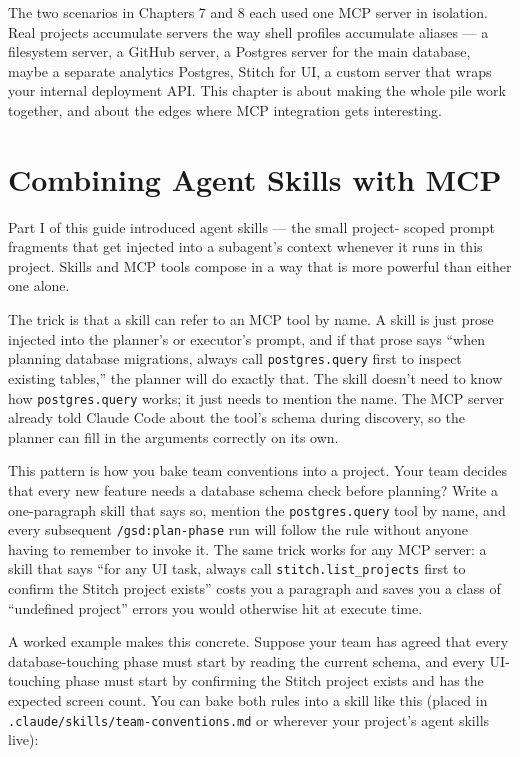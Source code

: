 \documentclass[11pt,letterpaper,openany]{book}
\begin{document}
The two scenarios in Chapters 7 and 8 each used one MCP server in
isolation. Real projects accumulate servers the way shell profiles
accumulate aliases --- a filesystem server, a GitHub server, a
Postgres server for the main database, maybe a separate analytics
Postgres, Stitch for UI, a custom server that wraps your internal
deployment API. This chapter is about making the whole pile work
together, and about the edges where MCP integration gets
interesting.

\section{Combining Agent Skills with MCP}

Part I of this guide introduced agent skills --- the small project-
scoped prompt fragments that get injected into a subagent's context
whenever it runs in this project. Skills and MCP tools compose in a
way that is more powerful than either one alone.

The trick is that a skill can refer to an MCP tool by name. A skill
is just prose injected into the planner's or executor's prompt, and
if that prose says ``when planning database migrations, always call
\texttt{postgres.query} first to inspect existing tables,'' the
planner will do exactly that. The skill doesn't need to know how
\texttt{postgres.query} works; it just needs to mention the name.
The MCP server already told Claude Code about the tool's schema
during discovery, so the planner can fill in the arguments correctly
on its own.

This pattern is how you bake team conventions into a project. Your
team decides that every new feature needs a database schema check
before planning? Write a one-paragraph skill that says so, mention
the \texttt{postgres.query} tool by name, and every subsequent
\texttt{/gsd:plan-phase} run will follow the rule without anyone
having to remember to invoke it. The same trick works for any MCP
server: a skill that says ``for any UI task, always call
\texttt{stitch.list\_projects} first to confirm the Stitch project
exists'' costs you a paragraph and saves you a class of
``undefined project'' errors you would otherwise hit at execute
time.

A worked example makes this concrete. Suppose your team has agreed
that every database-touching phase must start by reading the current
schema, and every UI-touching phase must start by confirming the
Stitch project exists and has the expected screen count. You can
bake both rules into a skill like this (placed in
\texttt{.claude/skills/team-conventions.md} or wherever your
project's agent skills live):
\end{document}
